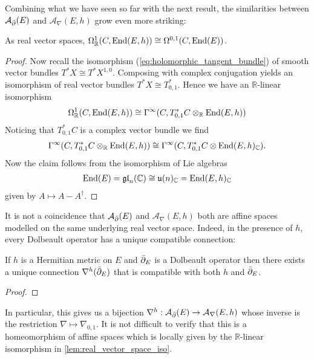 \documentclass[12pt]{ociamthesis}  %
\begin{document}
Combining what we have seen so far with the next result, the
similarities between $\mathcal A_{\bar{\partial}} (E)$ and $\mathcal A_\nabla(E,h)$ grow even more
striking:

\begin{lemma}\label{lem:real_vector_space_iso}
  As real vector spaces,
  $\Omega^1_{\mathbb{R}}(C,\operatorname{End}(E,h))\cong\Omega^{0,1}(C,\operatorname{End}(E))$.
  \begin{proof}
    Now recall the isomorphism (\ref{eq:holomorphic_tangent_bundle}) of
    smooth vector bundles $T^* X \cong T^*X^{1,0}$. Composing with
    complex conjugation yields an isomorphism of real vector bundles
    $T^*X \cong T^*_{0,1}$. Hence we have an $\mathbb{R}$-linear
    isomorphism
    \begin{align*}
      \Omega^1_{\mathbb{R}}(C,\operatorname{End}(E,h))
      \cong \Gamma^\infty(C,T^*_{0,1}C \otimes_{\mathbb{R}}\operatorname{End}(E,h))
    \end{align*}
    Noticing that $T_{0,1}^* C$ is a complex vector bundle
    we find
    \begin{align*}
      \Gamma^\infty(C,T^*_{0,1}C \otimes_{\mathbb{R}}\operatorname{End}(E,h))
      \cong\Gamma^\infty(C,T^*_{0,1}C \otimes\operatorname{End}(E,h)_{\mathbb{C}}).
    \end{align*}
    Now the claim follows from the isomorphism of Lie algebras
    \begin{align*}
      \operatorname{End}(E)
      =\mathfrak{gl}_n(\mathbb{C})
      \cong\mathfrak u(n)_{\mathbb{C}}
      =\operatorname{End}(E,h)_{\mathbb C}
    \end{align*}
    given by $A \mapsto A-A^\dagger$.
  \end{proof}
\end{lemma}

It is not a coincidence that $\mathcal A_{\bar{\partial}} (E)$ and $\mathcal A_\nabla(E,h)$ both are
affine spaces modelled on the same underlying real vector space.
Indeed, in the presence of $h$, every Dolbeault operator has a unique
compatible connection:

\begin{theorem}\label{thm:chern_connection}
  If $h$ is a Hermitian metric on $E$ and $\bar{\partial}_E$ is a Dolbeault
  operator then there exists a unique connection $\nabla^h(\bar{\partial}_E)$
  that is compatible with both $h$ and $\bar{\partial}_E$.
  \begin{proof}
    \missingproof
  \end{proof}
\end{theorem}

In particular, this gives us a bijection
$\nabla^h : \mathcal A_{\bar{\partial}} (E) \to \mathcal A_\nabla(E,h)$ whose inverse is the restriction
$\nabla \mapsto \nabla_{0,1}$. It is not difficult to verify that this
is a homeomorphism of affine spaces which is locally given by
the $\mathbb{R}$-linear isomorphism in \ref{lem:real_vector_space_iso}.
\end{document}
